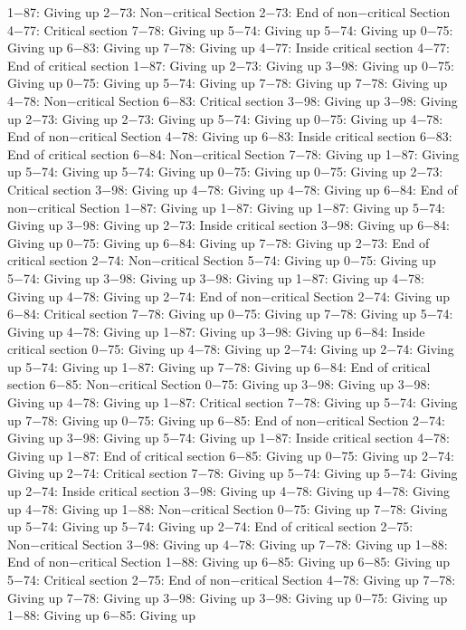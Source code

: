 1−87: Giving up
2−73: Non−critical Section
2−73: End of non−critical Section
4−77: Critical section
7−78: Giving up
5−74: Giving up
5−74: Giving up
0−75: Giving up
6−83: Giving up
7−78: Giving up
4−77: Inside critical section
4−77: End of critical section
1−87: Giving up
2−73: Giving up
3−98: Giving up
0−75: Giving up
0−75: Giving up
5−74: Giving up
7−78: Giving up
7−78: Giving up
4−78: Non−critical Section
6−83: Critical section
3−98: Giving up
3−98: Giving up
2−73: Giving up
2−73: Giving up
5−74: Giving up
0−75: Giving up
4−78: End of non−critical Section
4−78: Giving up
6−83: Inside critical section
6−83: End of critical section
6−84: Non−critical Section
7−78: Giving up
1−87: Giving up
5−74: Giving up
5−74: Giving up
0−75: Giving up
0−75: Giving up
2−73: Critical section
3−98: Giving up
4−78: Giving up
4−78: Giving up
6−84: End of non−critical Section
1−87: Giving up
1−87: Giving up
1−87: Giving up
5−74: Giving up
3−98: Giving up
2−73: Inside critical section
3−98: Giving up
6−84: Giving up
0−75: Giving up
6−84: Giving up
7−78: Giving up
2−73: End of critical section
2−74: Non−critical Section
5−74: Giving up
0−75: Giving up
5−74: Giving up
3−98: Giving up
3−98: Giving up
1−87: Giving up
4−78: Giving up
4−78: Giving up
2−74: End of non−critical Section
2−74: Giving up
6−84: Critical section
7−78: Giving up
0−75: Giving up
7−78: Giving up
5−74: Giving up
4−78: Giving up
1−87: Giving up
3−98: Giving up
6−84: Inside critical section
0−75: Giving up
4−78: Giving up
2−74: Giving up
2−74: Giving up
5−74: Giving up
1−87: Giving up
7−78: Giving up
6−84: End of critical section
6−85: Non−critical Section
0−75: Giving up
3−98: Giving up
3−98: Giving up
4−78: Giving up
1−87: Critical section
7−78: Giving up
5−74: Giving up
7−78: Giving up
0−75: Giving up
6−85: End of non−critical Section
2−74: Giving up
3−98: Giving up
5−74: Giving up
1−87: Inside critical section
4−78: Giving up
1−87: End of critical section
6−85: Giving up
0−75: Giving up
2−74: Giving up
2−74: Critical section
7−78: Giving up
5−74: Giving up
5−74: Giving up
2−74: Inside critical section
3−98: Giving up
4−78: Giving up
4−78: Giving up
4−78: Giving up
1−88: Non−critical Section
0−75: Giving up
7−78: Giving up
5−74: Giving up
5−74: Giving up
2−74: End of critical section
2−75: Non−critical Section
3−98: Giving up
4−78: Giving up
7−78: Giving up
1−88: End of non−critical Section
1−88: Giving up
6−85: Giving up
6−85: Giving up
5−74: Critical section
2−75: End of non−critical Section
4−78: Giving up
7−78: Giving up
7−78: Giving up
3−98: Giving up
3−98: Giving up
0−75: Giving up
1−88: Giving up
6−85: Giving up
